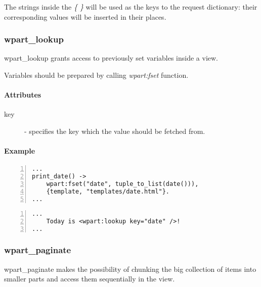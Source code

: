 The strings inside the {\it \{ \}} will be used as the keys to the request dictionary: their corresponding values will be inserted in their places.

\subsubsection{wpart\_lookup} wpart\_lookup grants access to previously set variables inside a view.

Variables should be prepared by calling {\it wpart:fset} function.

\paragraph{Attributes}
\begin{description}
\item[key]- specifies the key which the value should be fetched from.
\end{description}

\paragraph{Example}
\begin{Verbatim}[numbers=left, frame=single, label=controller.erl]
...
print_date() ->
    wpart:fset("date", tuple_to_list(date())),
    {template, "templates/date.html"}.
...
\end{Verbatim}
\begin{Verbatim}[numbers=left, frame=single, label=date.html]
...
    Today is <wpart:lookup key="date" />!
...
\end{Verbatim}

\subsubsection{wpart\_paginate} wpart\_paginate makes the possibility of chunking the big collection of items into smaller parts and access them sequentially in the view.
